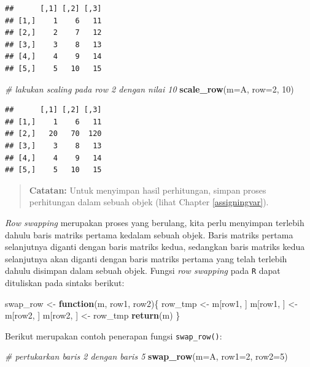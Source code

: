 \documentclass[
]{book}
\newenvironment{Shaded}{\begin{snugshade}}{\end{snugshade}}
\newcommand{\AttributeTok}[1]{\textcolor[rgb]{0.13,0.29,0.53}{#1}}
\newcommand{\CommentTok}[1]{\textcolor[rgb]{0.56,0.35,0.01}{\textit{#1}}}
\newcommand{\ControlFlowTok}[1]{\textcolor[rgb]{0.13,0.29,0.53}{\textbf{#1}}}
\newcommand{\DecValTok}[1]{\textcolor[rgb]{0.00,0.00,0.81}{#1}}
\newcommand{\FunctionTok}[1]{\textcolor[rgb]{0.13,0.29,0.53}{\textbf{#1}}}
\newcommand{\NormalTok}[1]{#1}
\newcommand{\OtherTok}[1]{\textcolor[rgb]{0.56,0.35,0.01}{#1}}
\theoremstyle{definition}
\theoremstyle{definition}
\theoremstyle{definition}
\theoremstyle{definition}
\theoremstyle{remark}
\begin{document}
\begin{verbatim}
##      [,1] [,2] [,3]
## [1,]    1    6   11
## [2,]    2    7   12
## [3,]    3    8   13
## [4,]    4    9   14
## [5,]    5   10   15
\end{verbatim}

\begin{Shaded}
\begin{Highlighting}[]
\CommentTok{\# lakukan scaling pada row 2 dengan nilai 10}
\FunctionTok{scale\_row}\NormalTok{(}\AttributeTok{m=}\NormalTok{A, }\AttributeTok{row=}\DecValTok{2}\NormalTok{, }\DecValTok{10}\NormalTok{)}
\end{Highlighting}
\end{Shaded}

\begin{verbatim}
##      [,1] [,2] [,3]
## [1,]    1    6   11
## [2,]   20   70  120
## [3,]    3    8   13
## [4,]    4    9   14
## [5,]    5   10   15
\end{verbatim}

\begin{quote}
\textbf{Catatan:} Untuk menyimpan hasil perhitungan, simpan proses perhitungan dalam sebuah objek (lihat Chapter \ref{assigningvar}).
\end{quote}

\emph{Row swapping} merupakan proses yang berulang, kita perlu menyimpan terlebih dahulu baris matriks pertama kedalam sebuah objek. Baris matriks pertama selanjutnya diganti dengan baris matriks kedua, sedangkan baris matriks kedua selanjutnya akan diganti dengan baris matriks pertama yang telah terlebih dahulu disimpan dalam sebuah objek. Fungsi \emph{row swapping} pada \texttt{R} dapat dituliskan pada sintaks berikut:

\begin{Shaded}
\begin{Highlighting}[]
\NormalTok{swap\_row }\OtherTok{\textless{}{-}} \ControlFlowTok{function}\NormalTok{(m, row1, row2)\{}
\NormalTok{  row\_tmp }\OtherTok{\textless{}{-}}\NormalTok{ m[row1, ]}
\NormalTok{  m[row1, ] }\OtherTok{\textless{}{-}}\NormalTok{ m[row2, ]}
\NormalTok{  m[row2, ] }\OtherTok{\textless{}{-}}\NormalTok{ row\_tmp}
  \FunctionTok{return}\NormalTok{(m)}
\NormalTok{\}}
\end{Highlighting}
\end{Shaded}

Berikut merupakan contoh penerapan fungsi \texttt{swap\_row()}:

\begin{Shaded}
\begin{Highlighting}[]
\CommentTok{\# pertukarkan baris 2 dengan baris 5}
\FunctionTok{swap\_row}\NormalTok{(}\AttributeTok{m=}\NormalTok{A, }\AttributeTok{row1=}\DecValTok{2}\NormalTok{, }\AttributeTok{row2=}\DecValTok{5}\NormalTok{)}
\end{Highlighting}
\end{Shaded}
\end{document}

